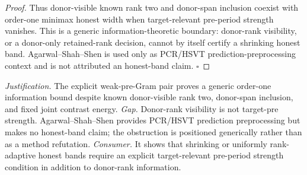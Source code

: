 \documentclass{article}
\begin{document}
\begin{proof}
Thus donor-visible known rank two and donor-span inclusion coexist with order-one minimax honest width when target-relevant pre-period strength vanishes.  This is a generic information-theoretic boundary: donor-rank visibility, or a donor-only retained-rank decision, cannot by itself certify a shrinking honest band.  Agarwal--Shah--Shen is used only as PCR/HSVT prediction-preprocessing context and is not attributed an honest-band claim. \(\square\)
\end{proof}
\par\smallskip\noindent \textit{Justification.} The explicit weak-pre-Gram pair proves a generic order-one information bound despite known donor-visible rank two, donor-span inclusion, and fixed joint contrast energy. \textit{Gap.} Donor-rank visibility is not target-pre strength. Agarwal--Shah--Shen provides PCR/HSVT prediction preprocessing but makes no honest-band claim; the obstruction is positioned generically rather than as a method refutation. \textit{Consumer.} It shows that shrinking or uniformly rank-adaptive honest bands require an explicit target-relevant pre-period strength condition in addition to donor-rank information.
\end{document}
